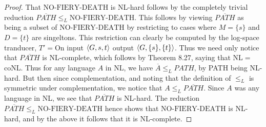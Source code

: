 \documentclass[a4paper,11pt]{article}
\numberwithin{equation}{section}
\begin{document}
\begin{proof}
		That $ \text{NO-FIERY-DEATH} $ is NL-hard follows by the completely trivial reduction $ \overline{PATH}\leq_L \text{NO-FIERY-DEATH} $. This follows by viewing $ \overline{PATH} $ as being a subset of $ \text{NO-FIERY-DEATH} $ by restricting to cases where $ M=\{s\} $ and $ D=\{t\} $ are singeltons. This restriction can clearly be computed by the log-space tranducer, $ T'= $On input $ \braket{G,s,t} $ output $ \braket{G,\{s\},\{t\}} $. Thus we need only notice that $ \overline{PATH} $ is NL-complete, which follows by Theorem 8.27, saying that NL$ = $coNL. Thus for any language $ A $ in NL, we have $ \overline{A}\leq_L PATH $, by PATH being NL-hard. But then since complementation, and noting that the definition of $ \leq_L $ is symmetric under complementation, we notice that $ A\leq_L \overline{PATH} $. Since $ A $ was any language in NL, we see that $ \overline{PATH} $ is NL-hard. The reduction $ \overline{PATH}\leq_L \text{NO-FIERY-DEATH} $ hence shows that $ \text{NO-FIERY-DEATH} $ is NL-hard, and by the above it follows that it is NL-complete.
	\end{proof}
\end{document}

